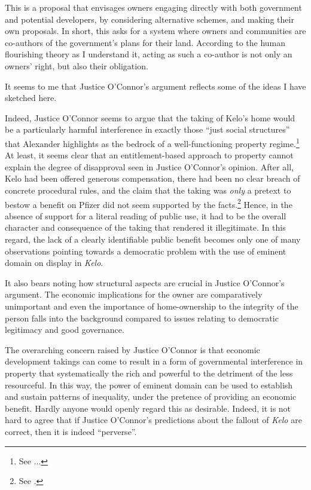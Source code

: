 {{This is a proposal that envisages owners engaging directly with both government and potential developers, by considering alternative schemes, and making their own proposals. In short, this asks for a system where owners and communities are co-authors of the government's plans for their land.  According to the human flourishing theory as I understand it, acting as such a co-author is not only an owners' right, but also their obligation. 

It seems to me that Justice O'Connor's argument reflects some of the ideas I have sketched here. 

}

Indeed, Justice O'Connor seems to argue that the taking of Kelo's home would be a particularly harmful interference in exactly those ``just social structures'' that Alexander highlights as the bedrock of a well-functioning property regime.\footnote{See ...} At least, it seems clear that an entitlement-based approach to property cannot explain the degree of disapproval seen in Justice O'Connor's opinion. After all, Kelo had been offered generous compensation, there had been no clear breach of concrete procedural rules, and the claim that the taking was {\it only} a pretext to bestow a benefit on Pfizer did not seem supported by the facts.\footnote{See \cite{bell06}.} Hence, in the absence of support for a literal reading of public use, it had to be the overall character and consequence of the taking that rendered it illegitimate. In this regard, the lack of a clearly identifiable public benefit becomes only one of many observations pointing towards a democratic problem with the use of eminent domain on display in {\it Kelo}.

It also bears noting how structural aspects are crucial in Justice O'Connor's argument. The economic implications for the owner are comparatively unimportant and even the importance of home-ownership to the integrity of the person falls into the background compared to issues relating to democratic legitimacy and good governance. } The overarching concern raised by Justice O'Connor is that economic development takings can come to result in a form of governmental interference in property that systematically  the rich and powerful to the detriment of the less resourceful. In this way, the power of eminent domain can be used to establish and sustain patterns of inequality, under the pretence of providing an economic benefit. Hardly anyone would openly regard this as desirable. Indeed, it is not hard to agree that if Justice O'Connor's predictions about the fallout of {\it Kelo} are correct, then it is indeed ``perverse''. 

